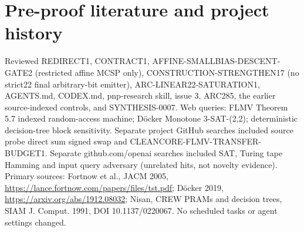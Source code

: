 \documentclass[11pt]{article}
\begin{document}
\section{Pre-proof literature and project history}
Reviewed REDIRECT1, CONTRACT1, AFFINE-SMALLBIAS-DESCENT-GATE2
(restricted affine MCSP only), CONSTRUCTION-STRENGTHEN17
(no strict22 final arbitrary-bit emitter), ARC-LINEAR22-SATURATION1,
AGENTS.md, CODEX.md, pnp-research skill, issue 3, ARC285,
the earlier source-indexed controls, and SYNTHESIS-0007.
Web queries: FLMV Theorem 5.7 indexed random-access machine;
D\"ocker Monotone 3-SAT-(2,2); deterministic decision-tree
block sensitivity. Separate project GitHub searches included
source probe direct sum signed swap and CLEANCORE-FLMV-TRANSFER-BUDGET1.
Separate github.com/openai searches included SAT, Turing tape Hamming
and input query adversary (unrelated hits, not novelty evidence).
Primary sources: Fortnow et al., JACM 2005,
\url{https://lance.fortnow.com/papers/files/tst.pdf};
D\"ocker 2019, \url{https://arxiv.org/abs/1912.08032};
Nisan, CREW PRAMs and decision trees, SIAM J. Comput. 1991,
DOI 10.1137/0220067. No scheduled tasks or agent settings changed.
\end{document}
